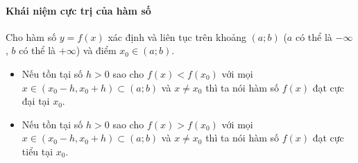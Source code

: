     \paragraph{Khái niệm cực trị của hàm số}
    \begin{dn}
        Cho hàm số $y=f(x)$ xác định và liên tục trên khoảng $(a; b) $ ($a$ có thể là $-\infty$,  $b$ có thể là $+\infty$) và điểm $x_0 \in(a; b)$.
        \begin{itemize}
            \item Nếu tồn tại số $h>0$ sao cho $f(x)<f\left(x_0\right)$ với mọi $x \in\left(x_0-h, x_0+h\right) \subset(a; b)$ và $x \neq x_0$ thì ta nói hàm số $f(x)$ đạt cực đại tại $x_0$.
            \item Nếu tồn tại số $h>0$ sao cho $f(x)>f\left(x_0\right)$ với mọi $x \in\left(x_0-h, x_0+h\right) \subset(a ; b)$ và $x \neq x_0$ thì ta nói hàm số $f(x)$ đạt cực tiểu tại $x_0$.
        \end{itemize}
    \end{dn}

